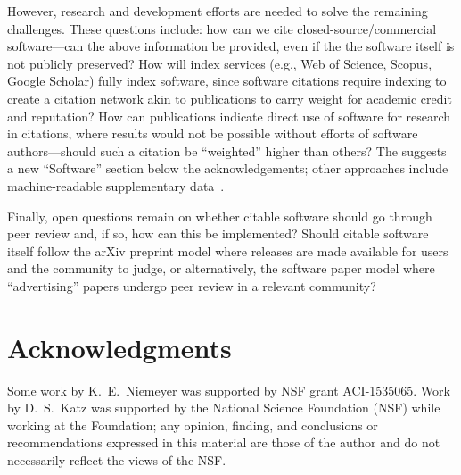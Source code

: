 \documentclass[letterpaper,10pt]{article}
\begin{document}
However, research and development efforts are needed to solve the remaining challenges.
These questions include: how can we cite closed-source\slash commercial software---can the above information be provided, even if the the software itself is not publicly preserved?
How will index services (e.g., Web of Science, Scopus, Google Scholar) fully index software, since software citations require indexing to create a citation network akin to publications to carry weight for academic credit and reputation?
How can publications indicate direct use of software for research in citations, where results would not be possible without efforts of software authors---should such a citation be ``weighted'' higher than others?
The \citet{AAS:2016} suggests a new ``Software'' section below the acknowledgements; other approaches include machine-readable supplementary data~\citep{Katz:2015aa}.

Finally, open questions remain on whether citable software should go through peer review and, if so, how can this be implemented?
Should citable software itself follow the arXiv preprint model where releases are made available for users and the community to judge, or alternatively, the software paper model where ``advertising'' papers undergo peer review in a relevant community?


\section*{Acknowledgments} \label{sec:acks}
Some work by K.\ E.\ Niemeyer was supported by NSF grant ACI-1535065.
Work by D.\ S.\ Katz was supported by the National Science Foundation (NSF) while working at the Foundation; any opinion, finding, and conclusions or recommendations expressed in this material are those of the author and do not necessarily reflect the views of the NSF.




\end{document}
